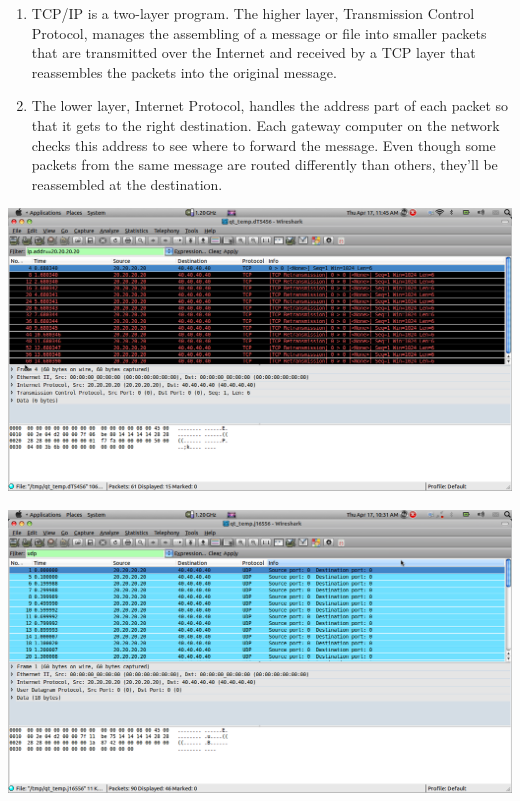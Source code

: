 \documentclass[a4paper,12pt,oneside]{article}
\begin{document}
\begin{enumerate}
\begin{enumerate}
\item TCP/IP is a two-layer program. The higher layer, Transmission Control Protocol,
manages the assembling of a message or file into smaller packets that are transmitted over the Internet
and received by a TCP layer that reassembles the packets into the original message.
\item The lower layer, Internet Protocol, handles the address part of each packet so that it gets to the right destination. Each gateway computer on the network checks this address to see where to forward the message. Even though some packets from the same message are routed differently than others, they'll be reassembled at the destination.
\end{enumerate}
\begin{center}
 \includegraphics[width=13 cm,height=12 cm]{./tcp.png}
\end{center}
\begin{center}
\includegraphics[width=13 cm,height=12 cm]{./udp.png}
 

\end{center}
\end{enumerate}
\end{document}
